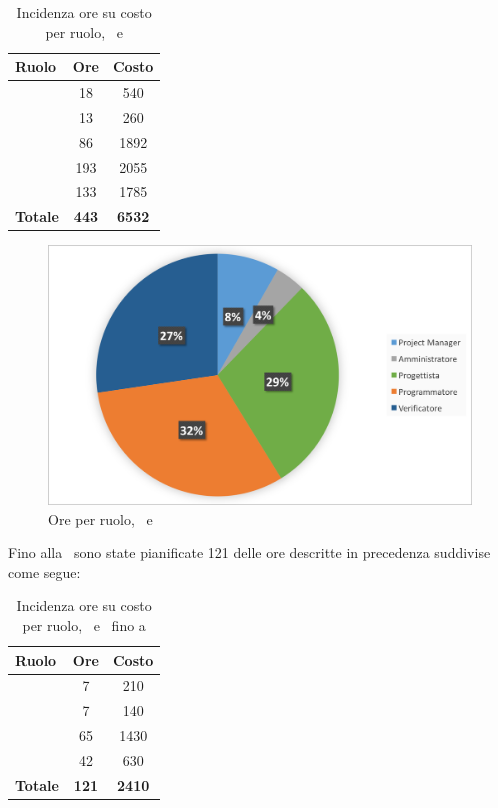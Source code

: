 \begin{table}[h]
	\begin{center}
		\begin{tabular}{|l|c|c|}
			\hline
			\textbf{Ruolo}	& \textbf{Ore} &	\textbf{Costo}	 \\
			\hline
						\Pm &	18 & 540\\
			\hline
			\Am	&	13 & 260\\
			\hline
			\Prog	&	86 & 1892\\
			\hline
			\Progr	&	193 & 2055\\
			\hline
			\Ver	&	133 & 1785\\
			\hline
			\textbf{Totale} &	 \textbf{443}	&	\textbf{6532}\\
			\hline
		\end{tabular}
	\end{center}
	\caption{Incidenza ore su costo per ruolo, \PD\ e \COD}
\end{table}

\begin{figure}[H]
	\centering 
	\includegraphics[scale=0.7]{Immagini/GraficiTorteSezione6/PDCOD.png}
	\caption{Ore per ruolo, \PD\ e \COD}
\end{figure}

\newpage
Fino alla \RP\ sono state pianificate 121 delle ore descritte in precedenza suddivise come segue:

\begin{table}[h]
	\begin{center}
		\begin{tabular}{|l|c|c|}
			\hline
			\textbf{Ruolo}	& \textbf{Ore} &	\textbf{Costo}	\\
			\hline
			\Pm &	7 & 210\\
			\hline
			\Am	&	7 & 140\\
			\hline
			\Prog	&	65 & 1430\\
			\hline
			\Ver	&	42 & 630\\
			\hline
			\textbf{Totale} &	 \textbf{121}	&	\textbf{2410}\\
			\hline
		\end{tabular}
	\end{center}
	\caption{Incidenza ore su costo per ruolo, \PD\ e \COD\ fino a \RP}
\end{table}

